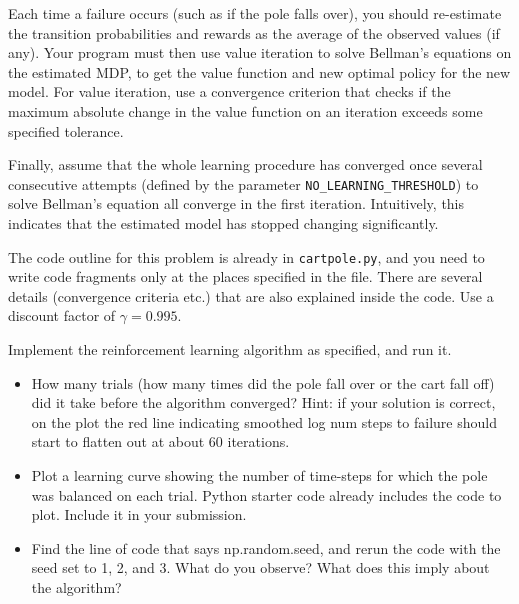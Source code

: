   Each time a failure occurs (such as if the pole falls over), you should 
  re-estimate the transition probabilities and rewards as the average of 
  the observed values (if any).  Your program must then use value iteration 
  to solve Bellman's equations on the estimated MDP, to get the value function 
  and new optimal policy for the new model.  For value iteration, use a 
  convergence criterion that checks if the maximum absolute change in the 
  value function on an iteration exceeds some specified tolerance. 

  Finally, assume that the whole learning procedure has converged 
  once several consecutive attempts (defined by the parameter 
  {\tt NO\_LEARNING\_THRESHOLD}) to solve Bellman's
  equation all converge in the first iteration. Intuitively, this
  indicates that the estimated model has stopped changing significantly.

  The code outline for this problem is already in 
  {\tt cartpole.py}, and you need to write code fragments only at the
  places specified in the file. There are several details (convergence criteria
  etc.) that are also explained inside the code. Use a discount factor
  of $\gamma = 0.995$.  

  Implement the reinforcement learning algorithm as specified, and run it.

\begin{itemize}
\item  How many trials (how many times did the pole fall over or the cart fall off) 
  did it take before the algorithm converged? 
  Hint: if your solution is correct, on the plot the red line indicating smoothed log num 
  steps to failure should start to flatten out at about 60 iterations.

\item  Plot a learning curve showing the number of time-steps for which the
  pole was balanced on each trial. Python starter code already includes the code to plot.
  Include it in your submission.
  
\item  Find the line of code that says np.random.seed, and rerun the code with the seed set to 1, 2, and 3.
       What do you observe? What does this imply about the algorithm?

\end{itemize}

\ifnum{} {
  
} \fi

